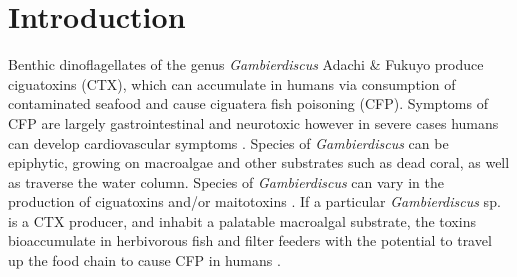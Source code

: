 \documentclass[12pt]{article}
\begin{document}
\newpage
\section*{Introduction}
Benthic dinoflagellates of the genus \emph{Gambierdiscus} Adachi \& Fukuyo produce ciguatoxins (CTX), which can accumulate in humans via consumption of contaminated seafood and cause ciguatera fish poisoning (CFP). 
Symptoms of CFP are largely gastrointestinal and neurotoxic however in severe cases humans can develop cardiovascular symptoms \citep{sims1987theoretical}. 
Species of \emph{Gambierdiscus} can be epiphytic, growing on macroalgae and other substrates such as dead coral, as well as traverse the water column. 
Species of \textit{Gambierdiscus} can vary in the production of ciguatoxins and/or maitotoxins \citep{chinain2010ciguatera,kohli2014high}. 
If a particular \emph{Gambierdiscus} sp. is a CTX producer, and inhabit a palatable macroalgal substrate, the toxins bioaccumulate in herbivorous fish and filter feeders with the potential to travel up the food chain to cause CFP in humans  \citep{chinain1997intraspecific,holmes1998gambierdiscus}. 
\end{document}

